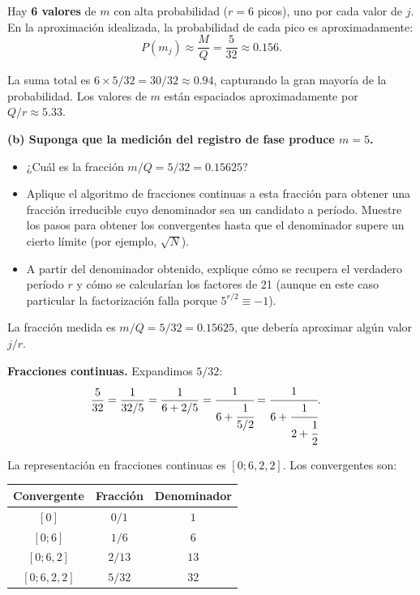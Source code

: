 Hay \textbf{6 valores} de $m$ con alta probabilidad ($r = 6$ picos), uno por cada valor de $j$. En la aproximación idealizada, la probabilidad de cada pico es aproximadamente:
$$
    P(m_j) \approx \frac{M}{Q} = \frac{5}{32} \approx 0.156.
$$

La suma total es $6 \times 5/32 = 30/32 \approx 0.94$, capturando la gran mayoría de la probabilidad. Los valores de $m$ están espaciados aproximadamente por $Q/r \approx 5.33$.

\vspace{0.5cm}

{\bfseries (b) Suponga que la medición del registro de fase produce $m=5$.
    \begin{itemize}
        \item ¿Cuál es la fracción $m/Q = 5/32 = 0.15625$?
        \item Aplique el algoritmo de fracciones continuas a esta fracción para obtener una fracción irreducible cuyo denominador sea un candidato a período. Muestre los pasos para obtener los convergentes hasta que el denominador supere un cierto límite (por ejemplo, $\sqrt{N}$).
        \item A partir del denominador obtenido, explique cómo se recupera el verdadero período $r$ y cómo se calcularían los factores de 21 (aunque en este caso particular la factorización falla porque $5^{r/2} \equiv -1$).
    \end{itemize}
}

La fracción medida es $m/Q = 5/32 = 0.15625$, que debería aproximar algún valor $j/r$.

\textbf{Fracciones continuas.} Expandimos $5/32$:
\begin{align*}
    \frac{5}{32} & = \frac{1}{32/5} = \frac{1}{6 + 2/5} = \cfrac{1}{6 + \cfrac{1}{5/2}} = \cfrac{1}{6 + \cfrac{1}{2 + \cfrac{1}{2}}}.
\end{align*}

La representación en fracciones continuas es $[0; 6, 2, 2]$. Los convergentes son:

\begin{center}
    \begin{tabular}{c|c|c}
        Convergente & Fracción & Denominador \\ \hline
        $[0]$       & $0/1$    & $1$         \\
        $[0;6]$     & $1/6$    & $6$         \\
        $[0;6,2]$   & $2/13$   & $13$        \\
        $[0;6,2,2]$ & $5/32$   & $32$
    \end{tabular}
\end{center}

